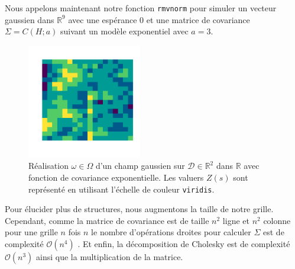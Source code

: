 \documentclass[10pt]{article} %
\begin{document}

Nous appelons maintenant notre fonction \texttt{rmvnorm} pour simuler un vecteur gaussien dans $\mathbb{R}^9$ avec une espérance $0$ et
une matrice de covariance $\Sigma = C(H ; a)$ suivant un modèle exponentiel avec $a = 3$.

\begin{figure}[h!]
    \centering
    \includegraphics[width=5cm]{media/grid9.png}
    \caption{Réalisation $\omega \in \Omega$ d'un champ gaussien sur $\mathcal{D} \in \mathbb{R}^2$ dans $\mathbb{R}$ avec fonction de covariance exponentielle. Les valuers $Z(s)$ sont représenté en utilisant l'échelle
    de couleur \texttt{viridis}.}
\end{figure}


Pour élucider plus de structures, nous augmentons la taille de notre grille. Cependant, comme la matrice de covariance est de taille $n^2$
ligne et $n^2$ colonne pour une grille $n$ fois $n$ le nombre d'opérations droites pour calculer $\Sigma$ est de complexité $\mathcal{O}(n^4)$ .
Et enfin, la décomposition de Cholesky est de complexité $\mathcal{O}(n^3)$ ainsi que la multiplication de la matrice.

\end{document}
